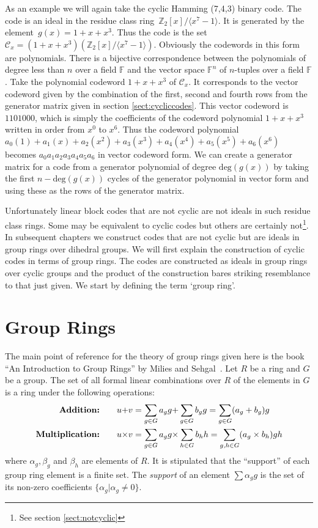 As an example we will again take the cyclic Hamming (7,4,3) binary code.
The code is an ideal in the residue class ring~$\mathbb{Z}_2[x] /  \langle x^7 - 1 \rangle $.
It is generated by the element~$g(x) = 1 + x + x^3$.
Thus the code is the set~$\mathcal{C}_x = (1 + x + x^3) ( \mathbb{Z}_2[x] / \langle x^7 - 1 \rangle )$.
Obviously the codewords in this form are polynomials.
There is a bijective correspondence between the polynomials of degree less than $n$ over a field $\mathbb{F}$ and the vector space $\mathbb{F}^n$ of $n$-tuples over a field $\mathbb{F}$.
Take the polynomial codeword $1 + x + x^3$ of $\mathcal{C}_x$.
It corresponds to the vector codeword given by the combination of the first, second and fourth rows from the generator matrix given in section \ref{sect:cycliccodes}.
This vector codeword is $1101000$, which is simply the coefficients of the codeword polynomial $1 + x + x^3$ written in order from $x^0$ to $x^6$.
Thus the codeword polynomial $a_0(1) + a_1(x) + a_2(x^2) + a_3 ( x^3 ) + a_4 ( x^4 ) + a_5 ( x^5 ) + a_6 ( x^6 )$ becomes $a_0 a_1 a_2 a_3 a_4 a_5 a_6$ in vector codeword form.
We can create a generator matrix for a code from a generator polynomial of degree $\textrm{deg}(g(x))$ by taking the first $n-\textrm{deg}(g(x))$ cycles of the generator polynomial in vector form and using these as the rows of the generator matrix.

Unfortunately linear block codes that are not cyclic are not ideals in such residue class rings.
Some may be equivalent to cyclic codes but others are certainly not\footnote{See section \ref{sect:notcyclic}}.
In subsequent chapters we construct codes that are not cyclic but are ideals in group rings over dihedral groups.
We will first explain the construction of cyclic codes in terms of group rings.
The codes are constructed as ideals in group rings over cyclic groups and the product of the construction bares striking resemblance to that just given.
We start by defining the term `group ring'.

\section{Group Rings}
The main point of reference for the theory of group rings given here is the book ``An Introduction to Group Rings'' by Milies and Sehgal~\cite{mil02}.
Let $R$ be a ring and $G$ be a group.
The set of all formal linear combinations over $R$ of the elements in $G$ is a ring under the following operations:
\begin{align*}
\textrm{\textbf{Addition:}} \qquad \displaystyle &u {\bf +} v = \sum_{g \in G} a_g g {\bf +} \sum_{g \in G} b_g g = \sum_{g \in G} ( a_g + b_g ) g\\
\textrm{\textbf{Multiplication:}} \qquad \displaystyle &u {\bf \times} v = \sum_{g \in G} a_g g {\bf \times} \sum_{h \in G} b_h h = \sum_{g,h \in G} ( a_g \times b_h ) gh
\end{align*}
where $\alpha_g, \beta_g$ and $\beta_h$ are elements of $R$.
It is stipulated that the ``support'' of each group ring element is a finite set.
The \emph{support} of an element $\sum \alpha_g g$ is the set of its non-zero coefficients $\{ \alpha_g | \alpha_g \neq 0 \}$.

